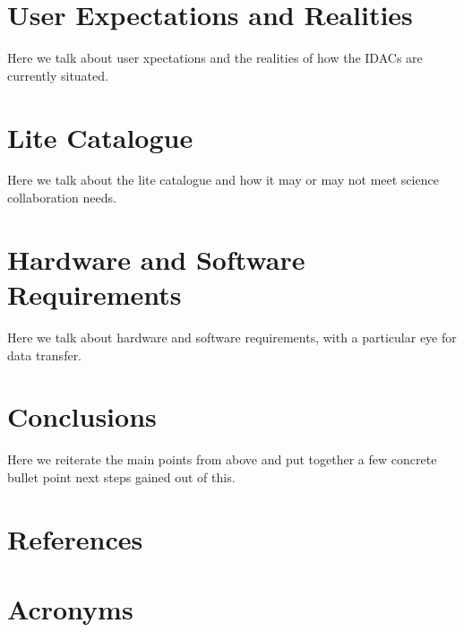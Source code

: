 \documentclass[OPS,authoryear,toc]{lsstdoc}
\begin{document}
\section{User Expectations and Realities}
Here we talk about user xpectations and the realities of how the IDACs are currently situated.

\section{Lite Catalogue}
Here we talk about the lite catalogue and how it may or may not meet science collaboration needs.

\section{Hardware and Software Requirements}
Here we talk about hardware and software requirements, with a particular eye for data transfer.

\section{Conclusions}
Here we reiterate the main points from above and put together a few concrete bullet point next steps gained out of this.

\appendix
\section{References} \label{sec:bib}
\renewcommand{\refname}{} %


\section{Acronyms} \label{sec:acronyms}

\end{document}
